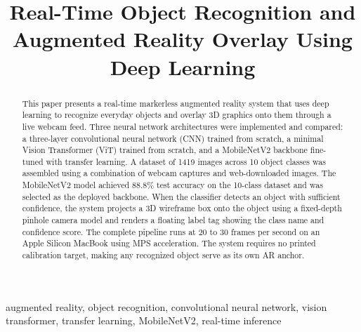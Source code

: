 \documentclass[conference]{IEEEtran}
\begin{document}
\title{Real-Time Object Recognition and Augmented Reality Overlay Using Deep Learning}

\author{
  \and
}

\maketitle

\begin{abstract}
This paper presents a real-time markerless augmented reality system that uses
deep learning to recognize everyday objects and overlay 3D graphics onto them
through a live webcam feed. Three neural network architectures were implemented
and compared: a three-layer convolutional neural network (CNN) trained from
scratch, a minimal Vision Transformer (ViT) trained from scratch, and a
MobileNetV2 backbone fine-tuned with transfer learning. A dataset of
1419 images across 10 object classes was assembled using a
combination of webcam captures and web-downloaded images. The MobileNetV2
model achieved 88.8\% test accuracy on the 10-class dataset and was selected
as the deployed backbone. When the classifier detects an object with sufficient
confidence, the system projects a 3D wireframe box onto the object using a
fixed-depth pinhole camera model and renders a floating label tag showing the
class name and confidence score. The complete pipeline runs at 20 to 30 frames per second on an Apple Silicon
MacBook using MPS acceleration.
The system requires no printed calibration target, making any recognized object
serve as its own AR anchor.
\end{abstract}

\begin{IEEEkeywords}
augmented reality, object recognition, convolutional neural network, vision
transformer, transfer learning, MobileNetV2, real-time inference
\end{IEEEkeywords}
\end{document}
